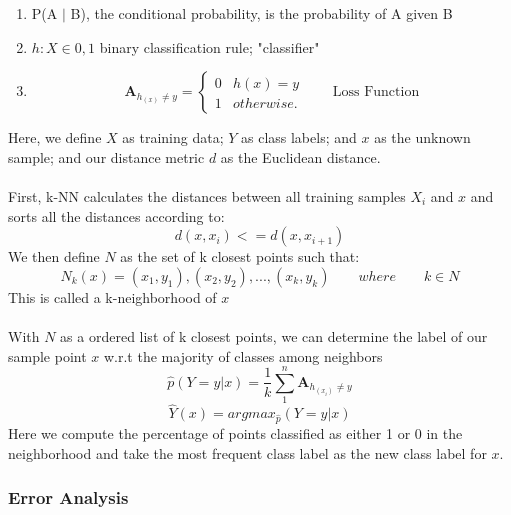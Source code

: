 \documentclass{report}
\begin{document}
\begin{enumerate}
	\item P(A $|$ B), the conditional probability, is the probability of A given B
	\item $h : X \in 0, 1$  \qquad  \qquad \textrm{binary classification rule; 
	"classifier" }
	\item \begin{equation*}
	  \textbf{A}_{h_(x) \neq y} = \begin{cases}
	        0 & h(x) = y 
	        \\ 
	        1 &  otherwise.
	        \end{cases} \qquad \textrm{Loss Function}
	 \end{equation*}
\end{enumerate}
Here, we define $X$ as training data; $Y$ as class labels; and $x$ as the unknown sample; and our distance metric $d$ as the Euclidean distance.
\\ \\
First, k-NN calculates the distances between all  training samples $X_{i}$ and $x$ and sorts all the distances according to:
\begin{equation}
d(x,x_{i}) <= d(x,x_{i+1})
\end{equation}
We then define $N$ as the set of k closest points such that:
\begin{equation}
N_{k}(x) = (x_{1}, y_{1}), (x_{2}, y_{2}), ... , (x_{k}, y_{k}) \qquad where \qquad k \in N
\end{equation} 
This is called a k-neighborhood of $x$  \\ \\
With $N$ as a ordered list of k closest points, we can determine the label of our sample point $x$ w.r.t the majority of classes among neighbors
\begin{equation*}
\hat{p}(Y = y | x) = \frac{1}{k} \sum_{1}^{n} \textbf{A}_{h_(x_{i}) \neq y} 
\end{equation*}
\begin{equation}
\hat{Y}(x) = argmax_{\hat{p}}(Y = y |x)
\end{equation}
Here we compute the percentage of points classified as either 1 or 0 in the neighborhood and take the most frequent class label as the new class label for $x$.
 \newline\newline
		
\subsubsection*{Error Analysis}
\end{document}
